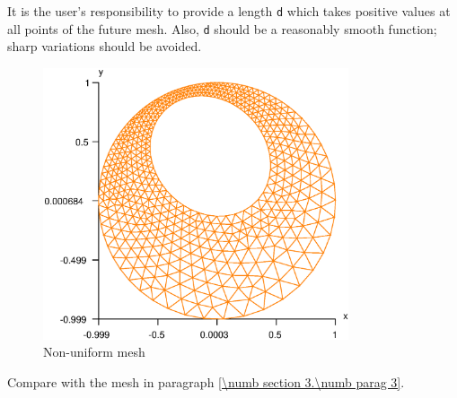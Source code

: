 It is the user's responsibility to provide a length {\small\tt d} which takes positive values
at all points of the future mesh.
Also, {\small\tt d} should be a reasonably smooth function; sharp variations should be avoided.

\begin{figure}[ht] \centering
 \includegraphics[width=90mm]{disk-non-unif}
  \caption{Non-uniform mesh}
  \label{\numb section 3.\numb fig 13}
\end{figure}

Compare with the mesh in paragraph \ref{\numb section 3.\numb parag 3}.






\section{~~}\label{\numb section 3.\numb parag 25}
 
